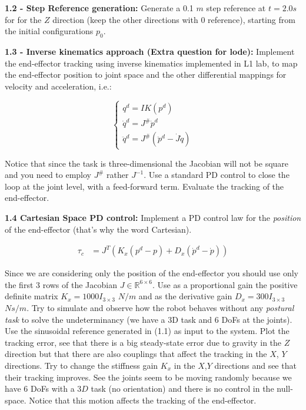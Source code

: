 \documentclass[11pt]{article}
\newcommand{\Rnum}{\mathbb{R}} %
\begin{document}
\quad

\noindent
\textbf{1.2 - Step Reference generation:}
Generate a 0.1 $m$  step reference at $t= 2.0s$ for  for the $Z$ direction
 (keep the other directions with 0 reference), starting from the initial configurations $p_0$.

\quad

\noindent
\textbf{1.3 - Inverse kinematics approach (Extra question for lode):}  Implement the end-effector tracking using inverse kinematics implemented in L1 lab, to map the end-effector position to joint space and the other differential mappings for velocity and acceleration, i.e.:


\begin{equation*}
\begin{cases}
q^d = IK(p^d) \\
\dot{q}^d =  J^{\#} \dot{p}^d \\
\ddot{q}^d =  J^{\#} ( \ddot{p}^d - \dot{J}\dot{q} )
\end{cases}
\end{equation*}

Notice that since the task is three-dimensional the Jacobian will not be square and you need to employ $J^{\#}$ rather $J^{-1}$.
Use a standard PD control to close the loop at the joint level, with a feed-forward term. Evaluate the tracking of the end-effector.


\quad

\noindent
\textbf{1.4  Cartesian Space PD control:}
Implement a PD control law for the \textit{position} of the end-effector (that's why the word Cartesian). 


\begin{align}
\tau_c & = J^T\left(K_x(p^d - p) + D_x(\dot{p}^d -\dot{p})\right)
\end{align}

Since we are considering only the position of the end-effector you should use only the first 3 rows of the Jacobian $J \in \Rnum^{6 \times 6}$. 
Use  as  a proportional gain the positive definite matrix $K_x = 1000I_{3\times3}$ $N/m$ and as the derivative gain $D_x  = 300I_{3\times3}$ $Ns/m$. 
Try to simulate and observe how the robot behaves without any \textit{postural task} 
to solve the undeterminancy (we have a 3D task and 6 DoFs at the joints).
Use the sinusoidal reference generated in (1.1) as input to the system. Plot the tracking error, see that there is a big steady-state error due to gravity in the $Z$ direction but that there are also couplings that affect  the tracking in the 
$X$, $Y$ directions. Try to change the stiffness gain $K_x$ in the $X$,$Y$ directions and see that their tracking improves. See the joints seem to be moving randomly because we have 6 DoFs with a $3D$ task (no orientation) and there is no control in the null-space. Notice that this motion affects the tracking of the end-effector. 
\end{document}
